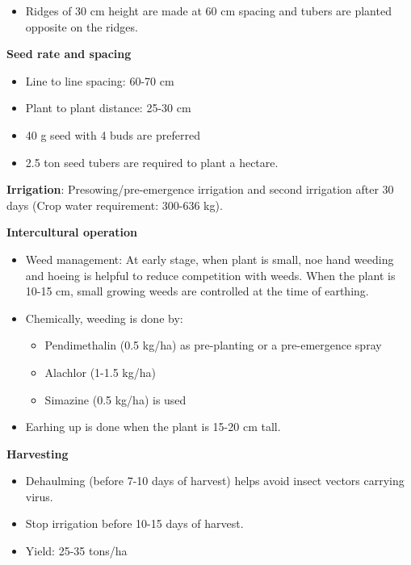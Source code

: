 \documentclass[
  openany]{book}
\providecommand{\tightlist}{%
  \setlength{\itemsep}{0pt}\setlength{\parskip}{0pt}}
\begin{document}
\begin{itemize}
\tightlist
\item
  Ridges of 30 cm height are made at 60 cm spacing and tubers are planted opposite on the ridges.
\end{itemize}

\textbf{Seed rate and spacing}

\begin{itemize}
\tightlist
\item
  Line to line spacing: 60-70 cm
\item
  Plant to plant distance: 25-30 cm
\item
  40 g seed with 4 buds are preferred
\item
  2.5 ton seed tubers are required to plant a hectare.
\end{itemize}

\textbf{Irrigation}: Presowing/pre-emergence irrigation and second irrigation after 30 days (Crop water requirement: 300-636 kg).

\textbf{Intercultural operation}

\begin{itemize}
\tightlist
\item
  Weed management: At early stage, when plant is small, noe hand weeding and hoeing is helpful to reduce competition with weeds. When the plant is 10-15 cm, small growing weeds are controlled at the time of earthing.
\item
  Chemically, weeding is done by:

  \begin{itemize}
  \tightlist
  \item
    Pendimethalin (0.5 kg/ha) as pre-planting or a pre-emergence spray
  \item
    Alachlor (1-1.5 kg/ha)
  \item
    Simazine (0.5 kg/ha) is used
  \end{itemize}
\item
  Earhing up is done when the plant is 15-20 cm tall.
\end{itemize}

\textbf{Harvesting}

\begin{itemize}
\tightlist
\item
  Dehaulming (before 7-10 days of harvest) helps avoid insect vectors carrying virus.
\item
  Stop irrigation before 10-15 days of harvest.
\item
  Yield: 25-35 tons/ha
\end{itemize}
\end{document}
